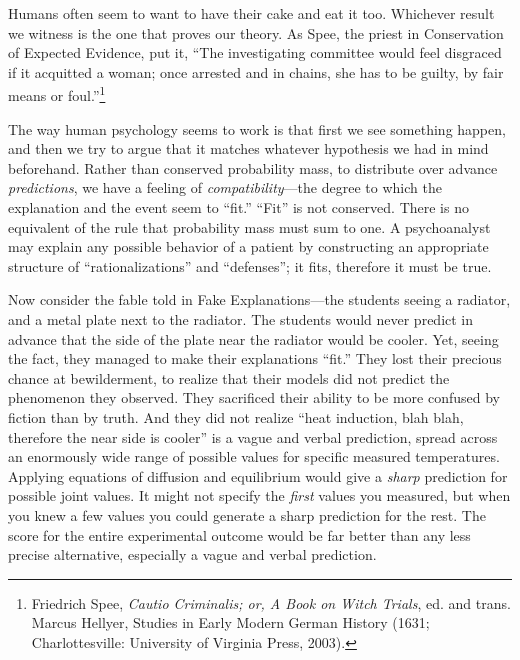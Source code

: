 {
 Humans often seem to want to have their cake and eat it too.
Whichever result we witness is the one that proves our theory. As Spee,
the priest in Conservation of Expected Evidence, put it,
``The investigating committee would feel disgraced if
it acquitted a woman; once arrested and in chains, she has to be
guilty, by fair means or foul.''\footnote{Friedrich Spee, \textit{Cautio Criminalis; or, A Book on Witch
Trials}, ed. and trans. Marcus Hellyer, Studies in Early Modern German
History (1631; Charlottesville: University of Virginia Press, 2003).}}

{
 The way human psychology seems to work is that first we see
something happen, and then we try to argue that it matches whatever
hypothesis we had in mind beforehand. Rather than conserved probability
mass, to distribute over advance \textit{predictions}, we have a
feeling of \textit{compatibility}{}---the degree to which the
explanation and the event seem to
``fit.''
``Fit'' is not conserved. There is
no equivalent of the rule that probability mass must sum to one. A
psychoanalyst may explain any possible behavior of a patient by
constructing an appropriate structure of
``rationalizations'' and
``defenses''; it fits, therefore it
must be true.}

{
 Now consider the fable told in Fake Explanations---the students
seeing a radiator, and a metal plate next to the radiator. The students
would never predict in advance that the side of the plate near the
radiator would be cooler. Yet, seeing the fact, they managed to make
their explanations ``fit.'' They
lost their precious chance at bewilderment, to realize that their
models did not predict the phenomenon they observed. They sacrificed
their ability to be more confused by fiction than by truth. And they
did not realize ``heat induction, blah blah, therefore
the near side is cooler'' is a vague and verbal
prediction, spread across an enormously wide range of possible values
for specific measured temperatures. Applying equations of diffusion and
equilibrium would give a \textit{sharp} prediction for possible joint
values. It might not specify the \textit{first} values you measured,
but when you knew a few values you could generate a sharp prediction
for the rest. The score for the entire experimental outcome would be
far better than any less precise alternative, especially a vague and
verbal prediction.}

\hr

